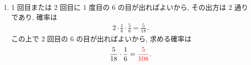 \begin{qenumerate}
{\begin{enumerate}
{				1, 2 回目には 6 以外の目が出ればよいから, 求める確率は
				\begin{align}
					\left(\frac{5}{6}\right)^{2}\cdot\frac{1}{6} = \red{\frac{25}{216}}.
				\end{align}
			}
			\item{
				1 回目または 2 回目に 1 度目の 6 の目が出ればよいから, その出方は 2 通りであり, 確率は
				\begin{align}
					2\cdot\frac{1}{6}\cdot\frac{5}{6} = \frac{5}{18}.
				\end{align}
				この上で 2 回目の 6 の目が出ればよいから, 求める確率は
				\begin{align}
					\frac{5}{18}\cdot\frac{1}{6} = \textcolor{red}{\frac{5}{108}}.
				\end{align}
			}
		\end{enumerate}
	}
\end{qenumerate}